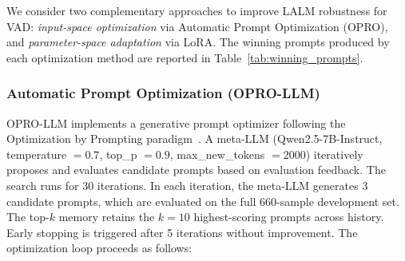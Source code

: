 \documentclass[11pt,a4paper]{article}
\begin{document}
We consider two complementary approaches to improve LALM robustness for VAD: \textit{input-space optimization} via Automatic Prompt Optimization (OPRO), and \textit{parameter-space adaptation} via LoRA. The winning prompts produced by each optimization method are reported in Table~\ref{tab:winning_prompts}.

\subsubsection{Automatic Prompt Optimization (OPRO-LLM)}
\label{subsubsec:opro_llm}

OPRO-LLM implements a generative prompt optimizer following the Optimization by Prompting paradigm~\cite{yang2023large}. A meta-LLM (Qwen2.5-7B-Instruct, temperature $= 0.7$, top\_p $= 0.9$, max\_new\_tokens $= 2000$) iteratively proposes and evaluates candidate prompts based on evaluation feedback. The search runs for 30 iterations. In each iteration, the meta-LLM generates 3 candidate prompts, which are evaluated on the full 660-sample development set. The top-$k$ memory retains the $k=10$ highest-scoring prompts across history. Early stopping is triggered after 5 iterations without improvement. The optimization loop proceeds as follows:
\end{document}
